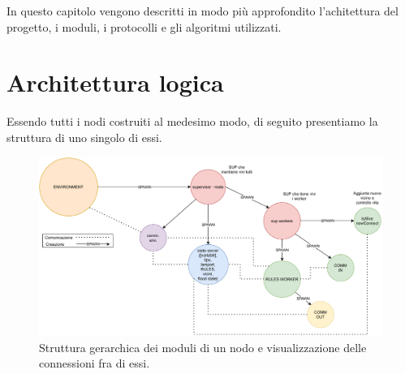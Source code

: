 \documentclass{memoir}
\begin{document}
In questo capitolo vengono descritti in modo più approfondito l'achitettura del
	   progetto, i moduli, i protocolli e gli algoritmi utilizzati.

\section{Architettura logica}

Essendo tutti i nodi costruiti al medesimo modo, di seguito presentiamo la struttura
	   di uno singolo di essi. 

\begin{figure}[h]
\includegraphics[scale=0.6]{draw_nodeworker.pdf}
\centering
\caption{Struttura gerarchica dei moduli di un nodo e visualizzazione delle connessioni
	   fra di essi.}
\label{img:struttura_nodo}
\end{figure}
\end{document}
